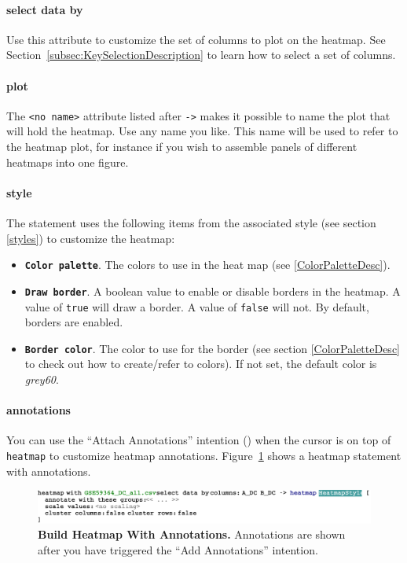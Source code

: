 \paragraph{select data by}
Use this attribute to customize the set of columns to plot on the heatmap. See Section~\ref{subsec:KeySelectionDescription} to learn how to select a set of columns.

\paragraph{plot}
The \texttt{<no name>} attribute listed after \texttt{->} makes it possible to name the plot that will hold the heatmap. Use any name you like. This name will be used to refer to the heatmap plot, for instance if you wish to assemble panels of different heatmaps into one figure.

\paragraph{style}
The statement uses the following items from the associated style (see section \ref{styles}) to customize the heatmap:
\begin{itemize}
\item \textbf{ \texttt{Color palette}}. The colors to use in the heat map (see \ref{ColorPaletteDesc}).
\item \textbf{ \texttt{Draw border}}. A boolean value to enable or disable borders in the heatmap. A value of \texttt{true} will draw a border. A value of \texttt{false} will not. By default, borders are enabled.
\item \textbf{ \texttt{Border color}}. The color to use for the border (see section \ref{ColorPaletteDesc} to check out how to create/refer to colors). If not set, the default color is \emph{grey60}.
\end{itemize}

\paragraph{annotations}
You can use the ``Attach Annotations'' intention (\intentionLightBulb) when the cursor is on top of \texttt{heatmap} to customize heatmap annotations. Figure~\ref{fig:BuildHeatmapWithAnnotations} shows a heatmap statement with annotations.

\begin{figure}[h!tbp]
  \centering
  \includegraphics[width=\figWidthWide]{figures/NewBuildHeatmapWithAnnotations.pdf}
\caption[Heatmap With Annotations.]{\textbf{Build Heatmap With Annotations.} Annotations are shown after you have triggered the ``Add Annotations'' intention.}
\label{fig:BuildHeatmapWithAnnotations}
\end{figure}

